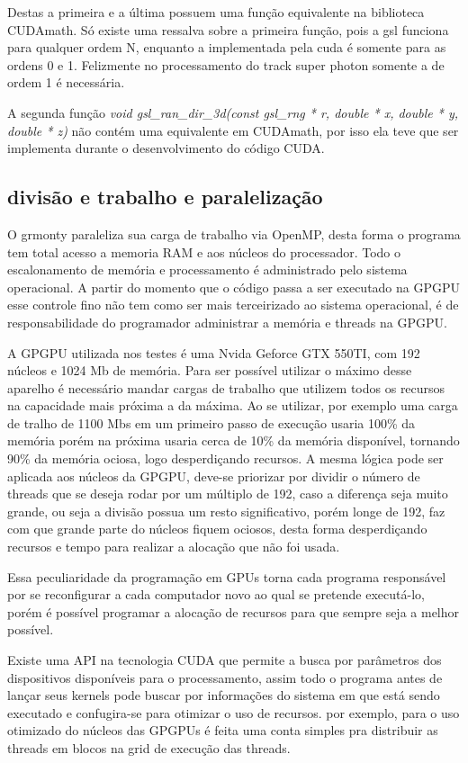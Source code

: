     Destas a primeira e a última possuem uma função equivalente na biblioteca CUDAmath. Só existe uma ressalva sobre a primeira função, pois a gsl funciona para qualquer ordem N, enquanto a implementada pela cuda é somente para as ordens 0 e 1. Felizmente no processamento do track super photon somente a de ordem 1 é necessária.

    A segunda função \textit{void gsl\_ran\_dir\_3d(const gsl\_rng * r, double * x, double * y, double * z)} não contém uma equivalente em CUDAmath, por isso ela teve que ser implementa durante o desenvolvimento do código CUDA.


  \subsection{divisão e trabalho e paralelização}
    O grmonty paraleliza sua carga de trabalho via OpenMP, desta forma o programa tem total acesso a memoria RAM e aos núcleos do processador. Todo o escalonamento de memória e processamento é administrado pelo sistema operacional. A partir do momento que o código passa a ser executado na GPGPU esse controle fino não tem como ser mais terceirizado ao sistema operacional, é de responsabilidade do programador administrar a memória e threads na GPGPU.

    A GPGPU utilizada nos testes é uma Nvida Geforce GTX 550TI, com 192 núcleos e 1024 Mb de memória. Para ser possível utilizar o máximo desse aparelho é necessário mandar cargas de trabalho que utilizem todos os recursos na capacidade mais próxima a da máxima. Ao se utilizar, por exemplo uma carga de tralho de 1100 Mbs em um primeiro passo de execução usaria 100\% da memória porém na próxima usaria cerca de 10\% da memória disponível, tornando 90\% da memória ociosa, logo desperdiçando recursos. A mesma lógica pode ser aplicada aos núcleos da GPGPU, deve-se priorizar por dividir o número de threads que se deseja rodar por um múltiplo de 192, caso a diferença seja muito grande, ou seja a divisão possua um resto significativo, porém longe de 192, faz com que grande parte do núcleos fiquem ociosos, desta forma desperdiçando recursos e tempo para realizar a alocação que não foi usada.

    Essa peculiaridade da programação em GPUs torna cada programa responsável por se reconfigurar a cada computador novo ao qual se pretende executá-lo, porém é possível programar a alocação de recursos para que sempre seja a melhor possível.

    Existe uma API na tecnologia CUDA que permite a busca por parâmetros dos dispositivos disponíveis para o processamento, assim todo o programa antes de lançar seus kernels pode buscar por informações do sistema em que está sendo executado e confugira-se para otimizar o uso de recursos. por exemplo, para o uso otimizado do núcleos das GPGPUs é feita uma conta simples pra distribuir as threads em blocos na grid de execução das threads.


